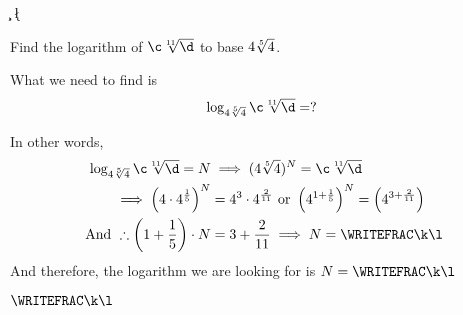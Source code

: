 

\POWER\va\vc\c
\POWER\va\vd\d
{}\vb\m\n
\FRACADD{}\vd\ve\p\q
\FRACDIV\p\q\m\n\k\l
  
\question[4] Find the logarithm of $\c\sqrt[\ve]{\d}$ to base $4\sqrt[5]{4}$. 

\watchout

\begin{solution}[\halfpage]
  What we need to find is
  \[ \log_{\va\sqrt[\vb]{\va}} \c\sqrt[\ve]{\d} = ?\]
  
  In other words,
  \begin{align}
    \log_{\va\sqrt[\vb]{\va}} \c\sqrt[\ve]{\d} = N &\implies 
    (\va\sqrt[\vb]{\va})^N = \c\sqrt[\ve]{\d} \\
    \implies \left( \va\cdot\va^{\frac{1}{\vb}}\right)^N
    &= \va^\vc\cdot\va^{\frac{\vd}{\ve}} 
    \text{ or } \left( \va^{1+\frac{1}{\vb}}\right)^N = 
    \left( \va^{\vc + \frac{\vd}{\ve}}\right) \\
    \text{ And }\therefore \left(1 + \dfrac{1}{\vb}\right)\cdot N &= 
    \vc + \dfrac{\vd}{\ve} \implies N = \WRITEFRAC\k\l
  \end{align}
  And therefore, the logarithm we are looking for is $N=\WRITEFRAC\k\l$
\end{solution}

\ifprintanswers\begin{codex}$\WRITEFRAC\k\l$\end{codex}\fi
